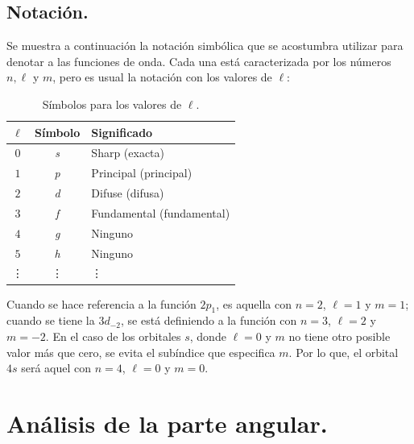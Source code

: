\subsection{Notación.}

Se muestra a continuación la notación simbólica que se acostumbra utilizar para denotar a las funciones de onda. Cada una está caracterizada por los números $n, \ell$ y $m$, pero es usual la notación con los valores de $\ell$:
\begin{table}
\centering
\large
\begin{tabular}{|c | c | l|} \hline
$\ell$ & Símbolo & Significado \\ \hline
$0$ & \emph{s} & Sharp (exacta) \\ \hline
$1$ & \emph{p} & Principal (principal) \\ \hline
$2$ & \emph{d} & Difuse (difusa) \\ \hline
$3$ & \emph{f} & Fundamental (fundamental) \\ \hline
$4$ & \emph{g} & Ninguno \\ \hline
$5$ & \emph{h} & Ninguno \\ \hline
\vdots & \vdots & \vdots \\ \hline    
\end{tabular}
\caption{Símbolos para los valores de $\ell$.}
\label{table:Tabla_valores_l}
\end{table}

Cuando se hace referencia a la función $2 p_{1}$, es aquella con $n = 2$, $\ell = 1$ y $m = 1$; cuando se tiene la $3 d_{-2}$, se está definiendo a la función con $n = 3$, $\ell = 2$ y $m = -2$. En el caso de los orbitales $s$, donde $\ell = 0$ y $m$ no tiene otro posible valor más que cero, se evita el subíndice que especifica $m$. Por lo que, el orbital $4s$ será aquel con $n = 4$, $\ell = 0$ y $m = 0$.

\section{Análisis de la parte angular.}

